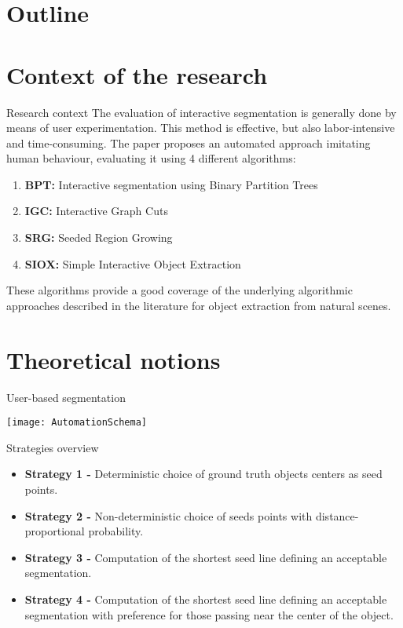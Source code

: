
\section*{Outline}
\frame{\tableofcontents}

\section{Context of the research}
\begin{frame}[t,fragile]{Research context}
The evaluation of interactive segmentation is generally done by means of user experimentation.\newline
This method is effective, but also labor-intensive and time-consuming.\newline 
The paper proposes an automated approach imitating human behaviour, evaluating it using 4 different algorithms:
\begin{enumerate}
\item \textbf{BPT: }Interactive segmentation using Binary Partition Trees
\item \textbf{IGC: } Interactive Graph Cuts
\item \textbf{SRG: } Seeded Region Growing 
\item \textbf{SIOX: } Simple Interactive Object Extraction
\end{enumerate}
These algorithms provide a good coverage of the underlying algorithmic approaches described in the literature for
object extraction from natural scenes.

\end{frame}

\section{Theoretical notions}

\begin{frame}[t,fragile]{User-based segmentation}
\begin{center}
\texttt{[image: AutomationSchema]}
\end{center}
\end{frame}

\begin{frame}[t,fragile]{Strategies overview}
\begin{itemize}
\item \textbf{Strategy 1 -} Deterministic choice of ground truth objects centers as seed points.
\item \textbf{Strategy 2 -} Non-deterministic choice of seeds points with distance-proportional probability.
\item \textbf{Strategy 3 -} Computation of the shortest seed line defining an acceptable segmentation.
\item \textbf{Strategy 4 -} Computation of the shortest seed line defining an acceptable segmentation with preference for those passing near the center of the object.
\end{itemize}
\end{frame}

